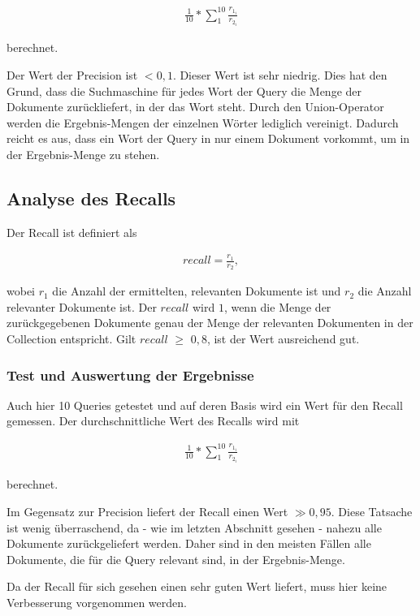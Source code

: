 \begin{align}
	\frac{1}{10} * \sum_{1}^{10} \frac{r_{1_i}}{r_{2_i}}
\end{align}

berechnet.

Der Wert der Precision ist $< 0,1$. Dieser Wert ist sehr niedrig. Dies hat den Grund, dass die Suchmaschine für jedes Wort der Query die Menge der Dokumente zurückliefert, in der das Wort steht. Durch den Union-Operator werden die Ergebnis-Mengen der einzelnen Wörter lediglich vereinigt. Dadurch reicht es aus, dass ein Wort der Query in nur einem Dokument vorkommt, um in der Ergebnis-Menge zu stehen. 

\subsection{Analyse des Recalls}
Der Recall ist definiert als

\begin{align}
	recall = \frac{r_1}{r_2},
\end{align}

wobei $r_1$ die Anzahl der ermittelten, relevanten Dokumente ist und $r_2$ die Anzahl relevanter Dokumente ist.
Der $recall$ wird $1$, wenn die Menge der zurückgegebenen Dokumente genau der Menge der relevanten Dokumenten in der Collection entspricht.
Gilt $recall$ $\ge$ $0,8$, ist der Wert ausreichend gut.

\subsubsection{Test und Auswertung der Ergebnisse}
Auch hier 10 Queries getestet und auf deren Basis wird ein Wert für den Recall gemessen. 
Der durchschnittliche Wert des Recalls wird mit 

\begin{align}
	\frac{1}{10} * \sum_{1}^{10} \frac{r_{1_i}}{r_{2_i}}
\end{align}

berechnet.

Im Gegensatz zur Precision liefert der Recall einen Wert $\gg 0,95$. Diese Tatsache ist wenig überraschend, da - wie im letzten Abschnitt gesehen - nahezu alle Dokumente zurückgeliefert werden. Daher sind in den meisten Fällen alle Dokumente, die für die Query relevant sind, in der Ergebnis-Menge.

Da der Recall für sich gesehen einen sehr guten Wert liefert, muss hier keine Verbesserung vorgenommen werden.

